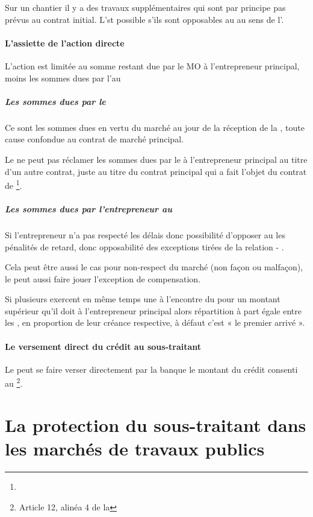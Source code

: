 				Sur un chantier il y a des travaux supplémentaires qui sont par principe pas prévus au contrat initial. L'\AD st possible s’ils sont opposables au \MO au sens de l’.


			\paragraph{L'assiette de l'action directe}

				L’action est limitée au somme restant due par le MO à l’entrepreneur principal, moins les sommes dues par l’\ep au \MO


				\subparagraph{Les sommes dues par le \MO}
				Ce sont les sommes dues en vertu du marché au jour de la réception de la \MED, toute cause confondue au contrat de marché principal.

				Le \ST ne peut pas réclamer les sommes dues par le \MO à l’entrepreneur principal au titre d’un autre contrat, juste au titre du contrat principal qui a fait l’objet du contrat de \ST*\footnote{}.

				\subparagraph{Les sommes dues par l’entrepreneur au \MO}
				Si l’entrepreneur n’a pas respecté les délais donc possibilité d’opposer au \ST les pénalités de retard, donc opposabilité des exceptions tirées de la relation \MO - \ep.

				Cela peut être aussi le cas pour non-respect du marché (non façon ou malfaçon), le \MO peut aussi faire jouer l’exception de compensation.

				Si plusieurs \ST exercent en même temps une \AD à l'encontre du \MO pour un montant supérieur qu’il doit à l’entrepreneur principal alors répartition à part égale entre les \ST, en proportion de leur créance respective, à défaut c’est « le premier arrivé ».



			\paragraph{Le versement direct du crédit au sous-traitant}

				Le \ST peut se faire verser directement par la banque le montant du crédit consenti au \MO\footnote{Article 12, alinéa 4 de la \loiST}.

\section{La protection du sous-traitant dans les marchés de travaux publics}

